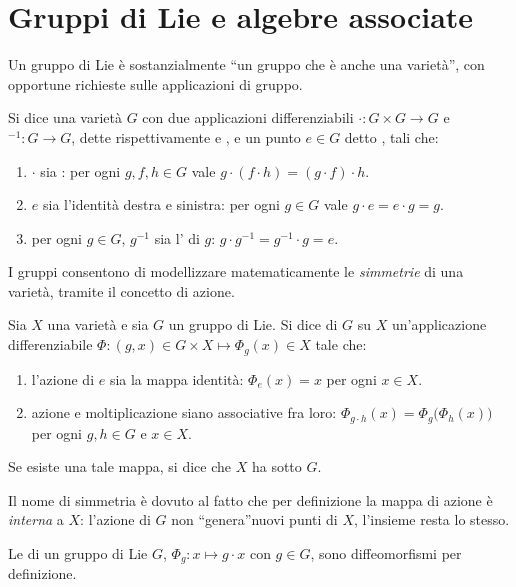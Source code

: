 \section{Gruppi di Lie e algebre associate}
Un gruppo di Lie è sostanzialmente \textquotedblleft un gruppo che è anche una varietà\textquotedblright, con opportune richieste sulle applicazioni di gruppo.
\begin{definition}
  Si dice  una varietà $G$ con due applicazioni differenziabili $\cdot: G \times G \to G$ e ${}^{-1}: G\to G$, dette rispettivamente  e , e un punto $e \in G$ detto , tali che:
  \begin{enumerate}
    \item $\cdot $ sia : per ogni $g,f,h \in G$ vale $g\cdot (f\cdot h) = (g\cdot f) \cdot h$.
    \item $e$ sia l'identità destra e sinistra: per ogni $g \in G$ vale $g \cdot e = e \cdot g = g$.
    \item per ogni $g \in G$, $g^{-1}$ sia l' di $g$: $g \cdot g^{-1} = g^{-1}\cdot g = e$.
  \end{enumerate}
\end{definition}

I gruppi consentono di modellizzare matematicamente le \emph{simmetrie} di una varietà, tramite il concetto di azione.
\begin{definition}
  Sia $X$ una varietà e sia $G$ un gruppo di Lie. Si dice  di $G$ su $X$ un'applicazione differenziabile $\Phi:(g,x) \in G \times X \mapsto \Phi_g(x) \in X$ tale che:
  \begin{enumerate}
    \item l'azione di $e$ sia la mappa identità: $\Phi_e (x) = x$ per ogni $x \in X$.
    \item azione e moltiplicazione siano associative fra loro: $\Phi_{g\cdot h} (x) = \Phi_g \big(\Phi_h (x)\big)$ per ogni $g,h \in G$ e $x \in X$.
  \end{enumerate}
Se esiste una tale mappa, si dice che $X$ ha  sotto $G$. 
\end{definition}
\begin{remark}
  Il nome di simmetria è dovuto al fatto che per definizione la mappa di azione è \emph{interna} a $X$: l'azione di $G$ non \textquotedblleft genera\textquotedblright nuovi punti di $X$, l'insieme resta lo stesso.
\end{remark}
\begin{remark}
  Le  di un gruppo di Lie $G$, $\Phi_g: x \mapsto g\cdot x$ con $g \in G$, sono diffeomorfismi per definizione.
\end{remark}

